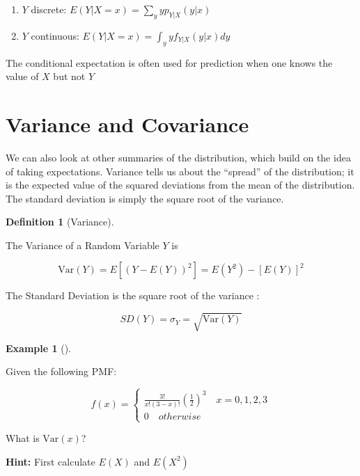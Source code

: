 \documentclass[
  letterpaper,
]{book}
\providecommand{\tightlist}{%
  \setlength{\itemsep}{0pt}\setlength{\parskip}{0pt}}\usepackage{longtable,booktabs,array}
\theoremstyle{definition}
\newtheorem{definition}{Definition}[chapter]
\theoremstyle{definition}
\newtheorem{example}{Example}[chapter]
\theoremstyle{plain}
\theoremstyle{definition}
\theoremstyle{plain}
\theoremstyle{plain}
\theoremstyle{remark}
\begin{document}
\begin{enumerate}
\def\labelenumi{\arabic{enumi}.}
\tightlist
\item
  \(Y\) discrete: \(E(Y|X = x) = \sum_y yp_{Y|X}(y|x)\)
\item
  \(Y\) continuous: \(E(Y|X = x) = \int_y yf_{Y|X}(y|x)dy\)
\end{enumerate}

The conditional expectation is often used for prediction when one knows
the value of \(X\) but not \(Y\)

\hypertarget{variance-and-covariance}{%
\section{Variance and Covariance}\label{variance-and-covariance}}

We can also look at other summaries of the distribution, which build on
the idea of taking expectations. Variance tells us about the ``spread''
of the distribution; it is the expected value of the squared deviations
from the mean of the distribution. The standard deviation is simply the
square root of the variance.

\leavevmode{}%
\begin{definition}[Variance]\label{def-}

The Variance of a Random Variable \(Y\) is

\[\text{Var}(Y) = E[(Y - E(Y))^2] =  E(Y^2)-[E(Y)]^2\]

The Standard Deviation is the square root of the variance :

\[SD(Y) = \sigma_Y= \sqrt{\text{Var}(Y)}\]

\end{definition}

\leavevmode{}%
\begin{example}[]\label{exm-var}

Given the following PMF:

\[f(x) = \begin{cases}
    \frac{3!}{x!(3-x)!}(\frac{1}{2})^3 \quad x = 0,1,2,3\\
      0 \quad otherwise
  \end{cases}\]

What is \(\text{Var}(x)\)?

\textbf{Hint:} First calculate \(E(X)\) and \(E(X^2)\)

\end{example}
\end{document}
